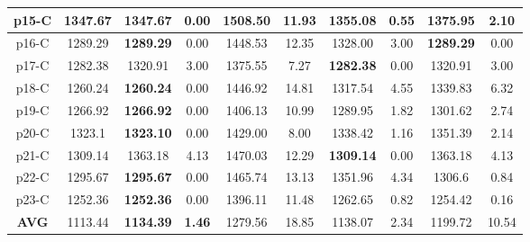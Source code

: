 \begin{table*}[!ht]
{\begin{tabular}{@{}cccccccccc@{}}
			p15-C & 1347.67 & \textbf{1347.67} & 0.00 & 1508.50 & 11.93 & 1355.08 & 0.55 & 1375.95 & 2.10 \\ \midrule
			p16-C & 1289.29 & \textbf{1289.29} & 0.00 & 1448.53 & 12.35 & 1328.00 & 3.00 & \textbf{1289.29} & 0.00 \\ \midrule
			p17-C & 1282.38 & 1320.91 & 3.00 & 1375.55 & 7.27 & \textbf{1282.38} & 0.00 & 1320.91 & 3.00 \\ \midrule
			p18-C & 1260.24 & \textbf{1260.24} & 0.00 & 1446.92 & 14.81 & 1317.54 & 4.55 & 1339.83 & 6.32 \\ \midrule
			p19-C & 1266.92 & \textbf{1266.92} & 0.00 & 1406.13 & 10.99 & 1289.95 & 1.82 & 1301.62 & 2.74 \\ \midrule
			p20-C & 1323.1 & \textbf{1323.10} & 0.00 & 1429.00 & 8.00 & 1338.42 & 1.16 & 1351.39 & 2.14 \\ \midrule
			p21-C & 1309.14 & 1363.18 & 4.13 & 1470.03 & 12.29 & \textbf{1309.14} & 0.00 & 1363.18 & 4.13 \\ \midrule
			p22-C & 1295.67 & \textbf{1295.67} & 0.00 & 1465.74 & 13.13 & 1351.96 & 4.34 & 1306.6 & 0.84 \\ \midrule
			p23-C & 1252.36 & \textbf{1252.36} & 0.00 & 1396.11 & 11.48 & 1262.65 & 0.82 & 1254.42 & 0.16 \\ \midrule
			\textbf{AVG} & 1113.44 & \textbf{1134.39} & \textbf{1.46} & 1279.56 & 18.85 & 1138.07 & 2.34 & 1199.72 & 10.54 \\ \bottomrule
		\end{tabular}%
	}
\end{table*}